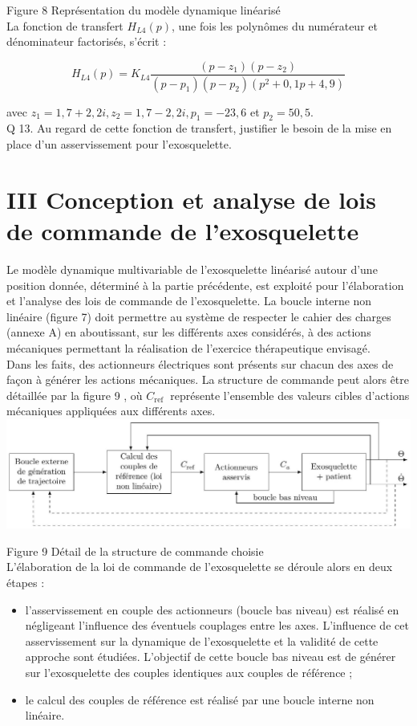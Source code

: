 \documentclass[10pt]{article}
\begin{document}
Figure 8 Représentation du modèle dynamique linéarisé\\
La fonction de transfert $H_{L 4}(p)$, une fois les polynômes du numérateur et dénominateur factorisés, s'écrit :

$$
H_{L 4}(p)=K_{L 4} \frac{\left(p-z_{1}\right)\left(p-z_{2}\right)}{\left(p-p_{1}\right)\left(p-p_{2}\right)\left(p^{2}+0,1 p+4,9\right)}
$$

avec $z_{1}=1,7+2,2 i, z_{2}=1,7-2,2 i, p_{1}=-23,6$ et $p_{2}=50,5$.\\
Q 13. Au regard de cette fonction de transfert, justifier le besoin de la mise en place d'un asservissement pour l'exosquelette.

\section*{III Conception et analyse de lois de commande de l'exosquelette}
Le modèle dynamique multivariable de l'exosquelette linéarisé autour d'une position donnée, déterminé à la partie précédente, est exploité pour l'élaboration et l'analyse des lois de commande de l'exosquelette. La boucle interne non linéaire (figure 7) doit permettre au système de respecter le cahier des charges (annexe A) en aboutissant, sur les différents axes considérés, à des actions mécaniques permettant la réalisation de l'exercice thérapeutique envisagé.\\
Dans les faits, des actionneurs électriques sont présents sur chacun des axes de façon à générer les actions mécaniques. La structure de commande peut alors être détaillée par la figure 9 , où $C_{\text {ref }}$ représente l'ensemble des valeurs cibles d'actions mécaniques appliquées aux différents axes.\\
\includegraphics[max width=\textwidth, center]{2025_07_03_97545f5dc188959e5663g-07}

Figure 9 Détail de la structure de commande choisie\\
L'élaboration de la loi de commande de l'exosquelette se déroule alors en deux étapes :

\begin{itemize}
  \item l'asservissement en couple des actionneurs (boucle bas niveau) est réalisé en négligeant l'influence des éventuels couplages entre les axes. L'influence de cet asservissement sur la dynamique de l'exosquelette et la validité de cette approche sont étudiées. L'objectif de cette boucle bas niveau est de générer sur l'exosquelette des couples identiques aux couples de référence ;
  \item le calcul des couples de référence est réalisé par une boucle interne non linéaire.
\end{itemize}
\end{document}

